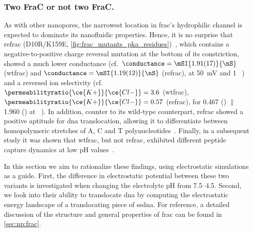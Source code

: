 \subsubsection{Two FraC or not two FraC.}
%
As with other nanopores, the narrowest location in \gls{frac}'s hydrophilic channel is expected to dominate
its nanofluidic properties. Hence, it is no surprise that \gls{refrac} (D10R/K159E,
\cref{fig:frac_mutants_pka_residues})~\cite{Wloka-2016}, which contains a negative-to-positive charge reversal
mutation at the bottom of its constriction, showed a much lower conductance (cf.~$\conductance =
\mSI{1.91(17)}{\nS}$ (\gls{wtfrac}) and $\conductance = \mSI{1.19(12)}{\nS}$ (\gls{refrac}), at
\SI{+50}{mV} and \SI{1}{\Molar} ~\cite{Wloka-2016}) and a reversed ion selectivity
(cf.~$\permeabilityratio{\ce{K+}}{\ce{Cl-}} = 3.6$ (\gls{wtfrac}), $\permeabilityratio{\ce{K+}}{\ce{Cl-}} =
0.57$ (\gls{refrac}), for \SI{0.467}{\Molar}  (\cisi) $\|$ \SI{1.960}{\Molar}  (\transi) at
~\cite{Huang-2017}). In addition, counter to its wild-type counterpart, \gls{refrac} showed a positive
aptitude for \gls{dna} translocation, allowing it to differentiate between homopolymeric stretches of A, C and
T polynucleotides~\cite{Wloka-2016}. Finally, in a subsequent study it was shown that \gls{wtfrac}, but not
\gls{refrac}, exhibited different peptide capture dynamics at low pH values~\cite{Huang-2017}.

In this section we aim to rationalize these findings, using electrostatic simulations as a guide. First, the
difference in electrostatic potential between these two variants is investigated when changing the electrolyte
pH from \numrange{7.5}{4.5}. Second, we look into their ability to translocate \gls{dna} by computing the
electrostatic energy landscape of a translocating piece of \gls{ssdna}. For reference, a detailed discussion
of the structure and general properties of \gls{frac} can be found in \cref{sec:np:frac}.

